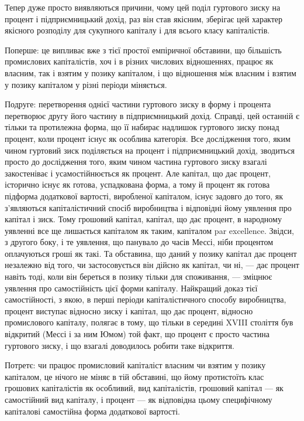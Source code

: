 Тепер дуже просто виявляються причини, чому цей поділ
гуртового зиску на процент і підприємницький дохід, раз він
став якісним, зберігає цей характер якісного розподілу для сукупного
капіталу і для всього класу капіталістів.

Поперше: це випливає вже з тієї простої емпіричної обставини,
що більшість промислових капіталістів, хоч і в різних числових
відношеннях, працює як власним, так і взятим у позику
капіталом, і що відношення між власним і взятим у позику капіталом
у різні періоди міняється.

Подруге: перетворення однієї частини гуртового зиску в форму і
процента перетворює другу його частину в підприємницький
дохід. Справді, цей останній є тільки та протилежна форма, що
її набирає надлишок гуртового зиску понад процент, коли процент
існує як особлива категорія. Все дослідження того, яким
чином гуртовий зиск поділяється на процент і підприємницький
дохід, зводиться просто до дослідження того, яким чином частина
гуртового зиску взагалі закостеніває і усамостійнюється
як процент. Але капітал, що дає процент, історично існує як
готова, успадкована форма, а тому й процент як готова підформа
додаткової вартості, виробленої капіталом, існує задовго
до того, як з’являються капіталістичний спосіб виробництва і
відповідні йому уявлення про капітал і зиск. Тому грошовий капітал,
капітал, що дає процент, в народному уявленні все ще лишається
капіталом як таким, капіталом par excellence. Звідси, з
другого боку, і те уявлення, що панувало до часів Мессі, ніби процентом
оплачуються гроші як такі. Та обставина, що даний у
позику капітал дає процент незалежно від того, чи застосовується
він дійсно як капітал, чи ні, — дає процент навіть тоді, коли він береться
в позику тільки для споживання, — зміцнює уявлення про
самостійність цієї форми капіталу. Найкращий доказ тієї самостійності,
з якою, в перші періоди капіталістичного способу
виробництва, процент виступає відносно зиску і капітал, що дає
процент, відносно промислового капіталу, полягає в тому, що
тільки в середині XVIII століття був відкритий (Мессі і за ним
Юмом) той факт, що процент є просто частина гуртового зиску,
і що взагалі доводилось робити таке відкриття.

Потретє: чи працює промисловий капіталіст власним чи
взятим у позику капіталом, це нічого не міняє в тій обставині,
що йому протистоїть клас грошових капіталістів як особливий,
вид капіталістів, грошовий капітал — як самостійний вид капіталу,
і процент — як відповідна цьому специфічному капіталові самостійна
форма додаткової вартості.

